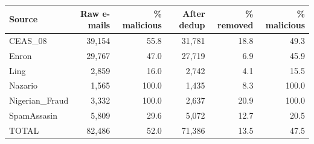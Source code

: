 \begin{tabular}{lrrrrr}
\toprule
Source & Raw e-mails & \% malicious & After dedup & \% removed & \% malicious \\
\midrule
CEAS\_08 & 39,154 & 55.8 & 31,781 & 18.8 & 49.3 \\
Enron & 29,767 & 47.0 & 27,719 & 6.9 & 45.9 \\
Ling & 2,859 & 16.0 & 2,742 & 4.1 & 15.5 \\
Nazario & 1,565 & 100.0 & 1,435 & 8.3 & 100.0 \\
Nigerian\_Fraud & 3,332 & 100.0 & 2,637 & 20.9 & 100.0 \\
SpamAssasin & 5,809 & 29.6 & 5,072 & 12.7 & 20.5 \\
\midrule
TOTAL & 82,486 & 52.0 & 71,386 & 13.5 & 47.5 \\
\bottomrule
\end{tabular}